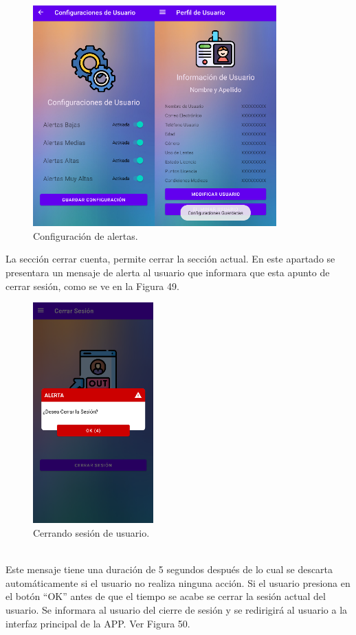 \documentclass[a4paper,10pt, oneside, titlepage]{article}
\begin{document}
	\begin{figure}[!ht]
		\centering
		\includegraphics[width = 0.60\linewidth, height = 8.5cm]{48.png}
		\caption{Configuración de alertas.}
	\end{figure}
	La sección cerrar cuenta, permite cerrar la sección actual. En este apartado se presentara un mensaje de alerta al usuario que informara que esta apunto de cerrar sesión, como se ve en la Figura 49.
	\begin{figure}[!ht]
		\centering
		\includegraphics[width = 0.4\linewidth, height = 8.5cm]{49.png}
		\caption{Cerrando sesión de usuario.}
	\end{figure}\\
	Este mensaje tiene una duración de 5 segundos después de lo cual se descarta automáticamente si el usuario no realiza ninguna acción. Si el usuario presiona en el botón ``OK'' antes de que el tiempo se acabe se cerrar la sesión actual del usuario. Se informara al usuario del cierre de sesión y se redirigirá al usuario a la interfaz principal de la APP. Ver Figura 50.
\end{document}
